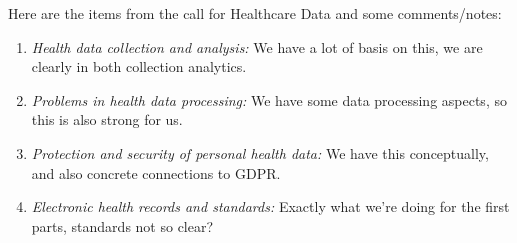 Here are the items from the call for Healthcare Data and some comments/notes:
\begin{enumerate}
\item 
\emph{Health data collection and analysis:}
We have a lot of basis on this, we are clearly in both collection analytics.

\item 
\emph{Problems in health data processing:}
We have some data processing aspects, so this is also strong for us.

\item 
\emph{Protection and security of personal health data:}
We have this conceptually, and also concrete connections to GDPR.

\item 
\emph{Electronic health records and standards:}
Exactly what we're doing for the first parts, standards not so clear?
\end{enumerate}



